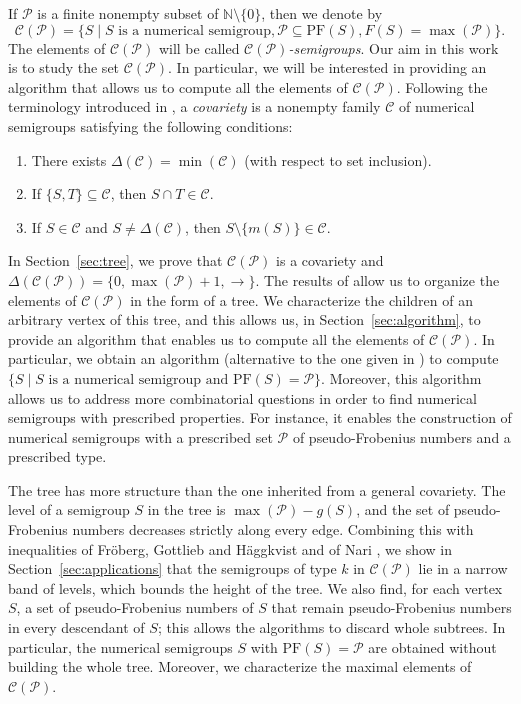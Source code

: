\documentclass[11pt]{article}
\numberwithin{equation}{section}
\newcommand{\CP}{\mathcal C(\mathcal P)}
\newcommand{\PF}{\mathrm{PF}}
\begin{document}
If $\mathcal P$ is a finite nonempty subset of $\mathbb{N}\setminus\{0\}$, then we denote by $$\mathcal C(\mathcal P)=\{S \mid S\text{ is a numerical semigroup}, \mathcal P\subseteq\mathrm{PF}(S),F(S)=\max(\mathcal P)\}.$$ The elements of $\mathcal C(\mathcal P)$ will be called \textit{$\mathcal C(\mathcal P)$-semigroups}. Our aim in this work is to study the set $\mathcal C(\mathcal P)$. In particular, we will be interested in providing an algorithm that allows us to compute all the elements of $\mathcal C(\mathcal P)$. Following the terminology introduced in \cite{covariedades}, a \textit{covariety} is a nonempty family $\mathcal C$ of numerical semigroups satisfying the following conditions:

\begin{enumerate}
    \item There exists $\Delta(\mathcal C)=\min(\mathcal C)$ (with respect to set inclusion).
    \item If $\{S,T\}\subseteq\mathcal C$, then $S\cap T\in\mathcal C$.
    \item If $S\in\mathcal C$ and $S\ne\Delta(\mathcal C)$, then $S\setminus\{m(S)\}\in\mathcal C$.
\end{enumerate}

In Section~\ref{sec:tree}, we prove that $\mathcal C(\mathcal P)$ is a covariety and $\Delta(\mathcal C(\mathcal P))=\{0,\max(\mathcal P)+1,\rightarrow\}$. The results of \cite{covariedades} allow us to organize the elements of $\mathcal C(\mathcal P)$ in the form of a tree. We characterize the children of an arbitrary vertex of this tree, and this allows us, in Section~\ref{sec:algorithm}, to provide an algorithm that enables us to compute all the elements of $\mathcal C(\mathcal P)$. In particular, we obtain an algorithm (alternative to the one given in \cite{delgado}) to compute $\{S \mid \text{$S$ is a numerical semigroup and } \mathrm{PF}(S)=\mathcal P\}$. Moreover, this algorithm allows us to address more combinatorial questions in order to find numerical semigroups with prescribed properties. For instance, it enables the construction of numerical semigroups with a prescribed set $\mathcal P$ of pseudo-Frobenius numbers and a prescribed type.

The tree has more structure than the one inherited from a general covariety. The level of a semigroup $S$ in the tree is $\max(\mathcal P)-g(S)$, and the set of pseudo-Frobenius numbers decreases strictly along every edge. Combining this with inequalities of Fr\"oberg, Gottlieb and H\"aggkvist \cite{froberg} and of Nari \cite{nari}, we show in Section~\ref{sec:applications} that the semigroups of type $k$ in $\CP$ lie in a narrow band of levels, which bounds the height of the tree. We also find, for each vertex $S$, a set of pseudo-Frobenius numbers of $S$ that remain pseudo-Frobenius numbers in every descendant of $S$; this allows the algorithms to discard whole subtrees. In particular, the numerical semigroups $S$ with $\PF(S)=\mathcal P$ are obtained without building the whole tree. Moreover, we characterize the maximal elements of $\CP$.
\end{document}
